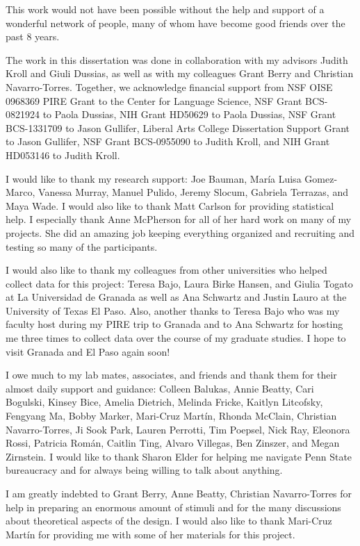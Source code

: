 
This work would not have been possible without the help and support of a wonderful network of people, many of whom have become good friends over the past 8 years.

The work in this dissertation was done in collaboration with my advisors Judith Kroll and Giuli Dussias, as well as with my colleagues Grant Berry and Christian Navarro-Torres. Together, we acknowledge financial support from NSF OISE 0968369 PIRE Grant to the Center for Language Science, NSF Grant BCS-0821924 to Paola Dussias, NIH Grant HD50629 to Paola Dussias, NSF Grant BCS-1331709 to Jason Gullifer, Liberal Arts College Dissertation Support Grant to Jason Gullifer, NSF Grant BCS-0955090 to Judith Kroll, and NIH Grant HD053146 to Judith Kroll.

I would like to thank my research support: Joe Bauman, Mar\'{i}a Luisa Gomez-Marco, Vanessa Murray, Manuel Pulido, Jeremy Slocum, Gabriela Terrazas, and Maya Wade. I would also like to thank Matt Carlson for providing statistical help. I especially thank Anne McPherson for all of her hard work on many of my projects. She did an amazing job keeping everything organized and recruiting and testing so many of the participants.

I would also like to thank my colleagues from other universities who helped collect data for this project: Teresa Bajo, Laura Birke Hansen, and Giulia Togato at La Universidad de Granada as well as Ana Schwartz and Justin Lauro at the University of Texas El Paso. Also, another thanks to Teresa Bajo who was my faculty host during my PIRE trip to Granada and to Ana Schwartz for hosting me three times to collect data over the course of my graduate studies. I hope to visit Granada and El Paso again soon!

I owe much to my lab mates, associates, and friends and thank them for their almost daily support and guidance: Colleen Balukas, Annie Beatty, Cari Bogulski, Kinsey Bice, Amelia Dietrich, Melinda Fricke, Kaitlyn Litcofsky, Fengyang Ma, Bobby Marker, Mari-Cruz Mart\'{i}n, Rhonda McClain, Christian Navarro-Torres, Ji Sook Park, Lauren Perrotti, Tim Poepsel, Nick Ray, Eleonora Rossi, Patricia Rom\'{a}n, Caitlin Ting, Alvaro Villegas, Ben Zinszer, and Megan Zirnstein. I would like to thank Sharon Elder for helping me navigate Penn State bureaucracy and for always being willing to talk about anything.

I am greatly indebted to Grant Berry, Anne Beatty, Christian Navarro-Torres for help in preparing an enormous amount of stimuli and for the many discussions about theoretical aspects of the design. I would also like to thank Mari-Cruz Mart\'{i}n for providing me with some of her materials for this project.

